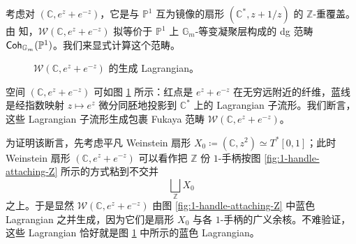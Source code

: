 \begin{exmp}\label{exmp:mirror-to-Coh-G-P1}
    考虑对 $(\mathbb{C}, e^z+e^{-z})$，它是与 $\mathbb{P}^1$ 互为镜像的扇形 $(\mathbb{C}^{\ast},z+1/z)$ 的 $\mathbb{Z}$-重覆盖。由 \cite{FLTZ12} 知，$\mathcal{W} (\mathbb{C},e^z+e^{-z})$ 拟等价于 $\mathbb{P}^1$ 上 $\mathbb{G}_m$-等变凝聚层构成的 dg 范畴 $\operatorname{\mathsf{Coh}}_{\mathbb{G}_m} (\mathbb{P}^1)$。我们来显式计算这个范畴。\par
    \begin{figure}[ht]
        \centering
        \caption{$\mathcal{W} (\mathbb{C}, e^z+e^{-z})$ 的生成 Lagrangian。}\label{fig:generating-Lag-equiv-P1}
    \end{figure}
    空间 $(\mathbb{C},e^z+e^{-z})$ 可如图 \ref{fig:generating-Lag-equiv-P1} 所示：红点是 $e^z+e^{-z}$ 在无穷远附近的纤维，蓝线是经指数映射 $z\mapsto e^z$ 微分同胚地投影到 $\mathbb{C}^{\ast}$ 上的 Lagrangian 子流形。我们断言，这些 Lagrangian 子流形生成包裹 Fukaya 范畴 $\mathcal{W} (\mathbb{C},e^z+e^{-z})$。\par
    为证明该断言，先考虑平凡 Weinstein 扇形 $X_0\coloneqq(\mathbb{C},z^2) \simeq T^{\ast} [0,1]$；此时 Weinstein 扇形 $(\mathbb{C},e^z+e^{-z})$ 可以看作把 $\mathbb{Z}$ 份 $1$-手柄按图 \ref{fig:1-handle-attaching-Z} 所示的方式粘到不交并
\[
        \bigsqcup_{\mathbb{Z}} X_0
    \]
    之上。于是显然 $\mathcal{W} (\mathbb{C},e^z+e^{-z})$ 由图 \ref{fig:1-handle-attaching-Z} 中蓝色 Lagrangian 之并生成，因为它们是扇形 $X_0$ 与各 $1$-手柄的广义余核。不难验证，这些 Lagrangian 恰好就是图 \ref{fig:generating-Lag-equiv-P1} 中所示的蓝色 Lagrangian。\par

\end{exmp}
